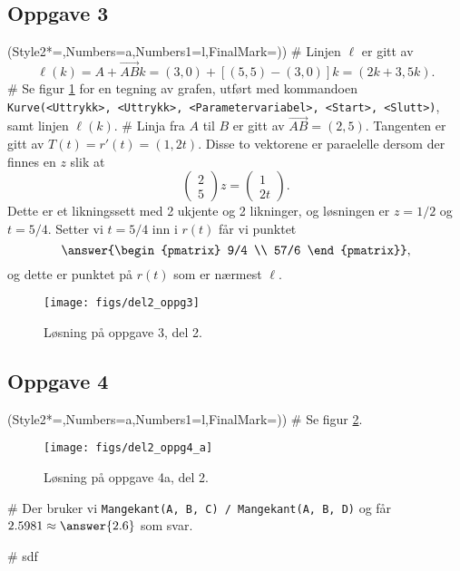 \subsection*{Oppgave 3}
\begin{easylist}[enumerate]
	\ListProperties(Style2*=,Numbers=a,Numbers1=l,FinalMark={)})
	# Linjen $\ell$ er gitt av
	\begin{equation*}
		\ell(k) = A + \vec{AB} k = (3, 0) + \left[ (5, 5) - (3, 0) \right] k = (2k+3, 5k).
	\end{equation*}
	# Se figur \ref{fig:del2_oppg3} for en tegning av grafen, utført med kommandoen \\
	\verb|Kurve(<Uttrykk>, <Uttrykk>, <Parametervariabel>, <Start>, <Slutt>)|,\\
	samt linjen $\ell(k)$.
	# Linja fra $A$ til $B$ er gitt av $\vec{AB} = (2, 5)$.
	Tangenten er gitt av $T(t) = r'(t) = (1, 2t)$.
	Disse to vektorene er paraelelle dersom der finnes en $z$ slik at
	\begin{equation*}
		\begin{pmatrix}
		2 \\
		5
		\end{pmatrix} z =
		\begin{pmatrix}
		1 \\
		2t
		\end{pmatrix}.
	\end{equation*}
	Dette er et likningssett med 2 ukjente og 2 likninger, og løsningen er $z = 1/2$ og $t = 5/4$.
	Setter vi $t = 5/4$ inn i $r(t)$ får vi punktet 
	\begin{equation*}
		\answer{\begin{pmatrix}
			9/4 \\
			57/6
			\end{pmatrix}},
	\end{equation*}
	og dette er punktet på $r(t)$ som er nærmest $\ell$.
\end{easylist}

\begin{figure}[ht!]
\centering
\texttt{[image: figs/del2\_oppg3]}
\caption{Løsning på oppgave 3, del 2.}
\label{fig:del2_oppg3}
\end{figure}

\subsection*{Oppgave 4}
\begin{easylist}[enumerate]
	\ListProperties(Style2*=,Numbers=a,Numbers1=l,FinalMark={)})
	# Se figur \ref{fig:del2_oppg4_a}.
	
	\begin{figure}[ht!]
	\centering
	\texttt{[image: figs/del2\_oppg4\_a]}
	\caption{Løsning på oppgave 4a, del 2.}
	\label{fig:del2_oppg4_a}
	\end{figure}
	
	# Der bruker vi \verb|Mangekant(A, B, C) / Mangekant(A, B, D)| og får $2.5981 \approx \answer{2.6}$ som svar.

	# sdf
\end{easylist}






